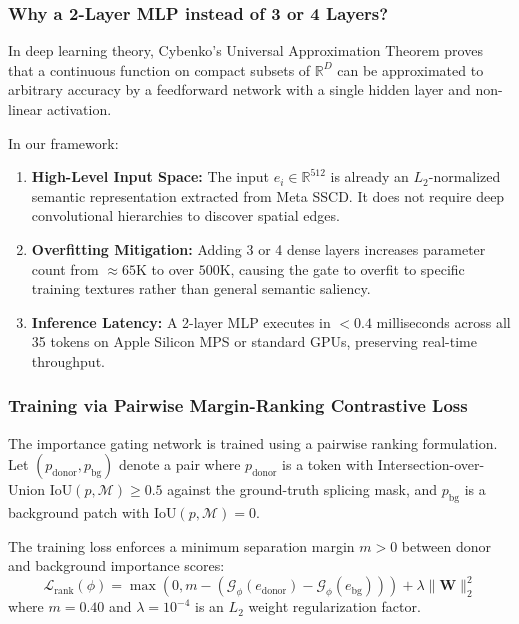 \documentclass[journal]{IEEEtran}
\begin{document}
\subsubsection{Why a 2-Layer MLP instead of 3 or 4 Layers?}
In deep learning theory, Cybenko's Universal Approximation Theorem proves that a continuous function on compact subsets of $\mathbb{R}^D$ can be approximated to arbitrary accuracy by a feedforward network with a single hidden layer and non-linear activation. 

In our framework:
\begin{enumerate}
    \item \textbf{High-Level Input Space:} The input $e_i \in \mathbb{R}^{512}$ is already an $L_2$-normalized semantic representation extracted from Meta SSCD. It does not require deep convolutional hierarchies to discover spatial edges.
    \item \textbf{Overfitting Mitigation:} Adding 3 or 4 dense layers increases parameter count from $\approx 65\text{K}$ to over $500\text{K}$, causing the gate to overfit to specific training textures rather than general semantic saliency.
    \item \textbf{Inference Latency:} A 2-layer MLP executes in $< 0.4$ milliseconds across all 35 tokens on Apple Silicon MPS or standard GPUs, preserving real-time throughput.
\end{enumerate}

\subsubsection{Training via Pairwise Margin-Ranking Contrastive Loss}
The importance gating network is trained using a pairwise ranking formulation. Let $(p_{\text{donor}}, p_{\text{bg}})$ denote a pair where $p_{\text{donor}}$ is a token with Intersection-over-Union $\text{IoU}(p, \mathcal{M}) \ge 0.5$ against the ground-truth splicing mask, and $p_{\text{bg}}$ is a background patch with $\text{IoU}(p, \mathcal{M}) = 0$.

The training loss enforces a minimum separation margin $m > 0$ between donor and background importance scores:
\begin{equation}
\mathcal{L}_{\text{rank}}(\phi) = \max\left(0, m - (\mathcal{G}_\phi(e_{\text{donor}}) - \mathcal{G}_\phi(e_{\text{bg}}))\right) + \lambda \|\mathbf{W}\|_2^2
\label{eq:margin_loss}
\end{equation}
where $m = 0.40$ and $\lambda = 10^{-4}$ is an $L_2$ weight regularization factor.
\end{document}
